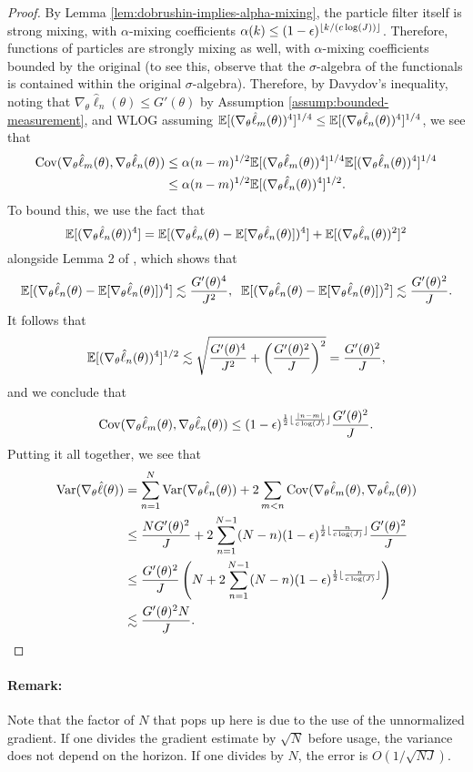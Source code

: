 \begin{proof}
By Lemma \ref{lem:dobrushin-implies-alpha-mixing}, the particle filter itself is strong mixing, with $\alpha$-mixing coefficients $\alpha(k) \leq (1-\epsilon)^{\lfloor k/(c\log(J)) \rfloor}$. Therefore, functions of particles are strongly mixing as well, with $\alpha$-mixing coefficients bounded by the original (to see this, observe that the $\sigma$-algebra of the functionals is contained within the original $\sigma$-algebra). Therefore, by Davydov's inequality, noting that $\nabla_\theta\hat\ell_n(\theta)\leq G'(\theta)$ by Assumption \ref{assump:bounded-measurement}, and WLOG assuming $\mathbb{E}[(\nabla_\theta\hat\ell_m(\theta))^4]^{1/4}\leq\mathbb{E}[(\nabla_\theta\hat\ell_n(\theta))^4]^{1/4}$, we see that
\begin{align*}
    \mathrm{Cov}(\nabla_\theta\hat\ell_m(\theta), \nabla_\theta\hat\ell_n(\theta)) 
    &\leq \alpha(n-m)^{1/2}\mathbb{E}[(\nabla_\theta\hat\ell_m(\theta))^4]^{1/4}\mathbb{E}[(\nabla_\theta\hat\ell_n(\theta))^4]^{1/4}\\
    &\leq \alpha(n-m)^{1/2}\mathbb{E}[(\nabla_\theta\hat\ell_n(\theta))^4]^{1/2}.
\end{align*}
To bound this, we use the fact that $$\mathbb{E}[(\nabla_\theta\hat\ell_n(\theta))^4] = \mathbb{E}[(\nabla_\theta\hat\ell_n(\theta)-\mathbb{E}[\nabla_\theta\hat\ell_n(\theta)])^4]+\mathbb{E}[(\nabla_\theta\hat\ell_n(\theta))^2]^2$$
alongside Lemma 2 of \cite{karjalainen23}, which shows that
$$\mathbb{E}[(\nabla_\theta\hat\ell_n(\theta)-\mathbb{E}[\nabla_\theta\hat\ell_n(\theta)])^4] \lesssim \frac{G'(\theta)^4}{J^2}, \;\; \mathbb{E}[(\nabla_\theta\hat\ell_n(\theta)-\mathbb{E}[\nabla_\theta\hat\ell_n(\theta)])^2] \lesssim \frac{G'(\theta)^2}{J}.$$
It follows that 
$$\mathbb{E}[(\nabla_\theta\hat\ell_n(\theta))^4]^{1/2} \lesssim  \sqrt{\frac{G'(\theta)^4}{J^2}+\left(\frac{G'(\theta)^2}{J}\right)^2} = \frac{G'(\theta)^2}{J},$$
and we conclude that 
$$\mathrm{Cov}(\nabla_\theta\hat\ell_m(\theta), \nabla_\theta\hat\ell_n(\theta)) \leq (1-\epsilon)^{\frac{1}{2}\lfloor \frac{|n-m|}{c\log(J)} \rfloor}\frac{G'(\theta)^2}{J}.$$
Putting it all together, we see that
\begin{align*}
    \mathrm{Var}(\nabla_\theta \hat\ell(\theta)) &= \sum_{n=1}^N \mathrm{Var}(\nabla_\theta\hat\ell_n(\theta)) + 2\sum_{m<n} \mathrm{Cov}(\nabla_\theta\hat\ell_m(\theta),\nabla_\theta\hat\ell_n(\theta))\\
    &\leq \frac{NG'(\theta)^2}{J} + 2\sum_{n=1}^{N-1} (N-n)(1-\epsilon)^{\frac{1}{2}\lfloor \frac{n}{c\log(J)} \rfloor}\frac{G'(\theta)^2}{J} \\
    &\leq \frac{G'(\theta)^2}{J} \left(N + 2\sum_{n=1}^{N-1} (N-n) (1-\epsilon)^{\frac{1}{2}\lfloor \frac{n}{c\log(J)} \rfloor}\right) \\
    &\lesssim \frac{G'(\theta)^2N}{J}.
\end{align*}
\end{proof}


\paragraph{Remark:} Note that the factor of $N$ that pops up here is due to the use of the unnormalized gradient. If one divides the gradient estimate by $\sqrt{N}$ before usage, the variance does not depend on the horizon. If one divides by $N$, the error is $O(1/\sqrt{NJ})$.